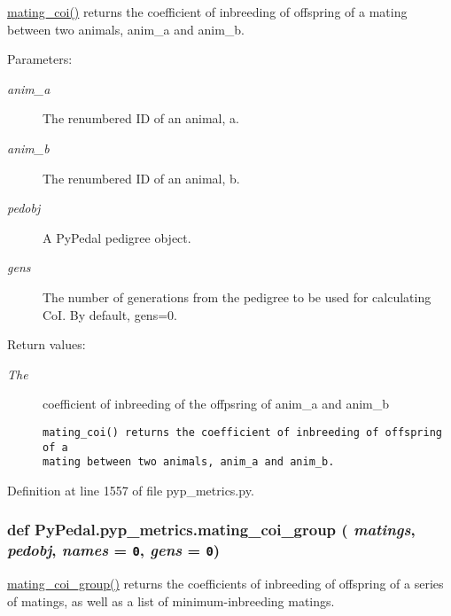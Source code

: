 \hyperlink{namespacePyPedal_1_1pyp__metrics_41c2baf2ca7fae116732adc32ff3a51b}{mating\_\-coi()} returns the coefficient of inbreeding of offspring of a mating between two animals, anim\_\-a and anim\_\-b. 

\begin{Desc}
\item[Parameters:]
\begin{description}
\item[{\em anim\_\-a}]The renumbered ID of an animal, a. \item[{\em anim\_\-b}]The renumbered ID of an animal, b. \item[{\em pedobj}]A Py\-Pedal pedigree object. \item[{\em gens}]The number of generations from the pedigree to be used for calculating Co\-I. By default, gens=0. \end{description}
\end{Desc}
\begin{Desc}
\item[Return values:]
\begin{description}
\item[{\em The}]coefficient of inbreeding of the offpsring of anim\_\-a and anim\_\-b

\footnotesize\begin{verbatim}mating_coi() returns the coefficient of inbreeding of offspring of a
mating between two animals, anim_a and anim_b.
\end{verbatim}
\normalsize
 \end{description}
\end{Desc}


Definition at line 1557 of file pyp\_\-metrics.py.\hypertarget{namespacePyPedal_1_1pyp__metrics_e051130e25232f609ede648a4dea9986}{
\subsubsection[mating\_\-coi\_\-group]{\setlength{\rightskip}{0pt plus 5cm}def Py\-Pedal.pyp\_\-metrics.mating\_\-coi\_\-group ( {\em matings},  {\em pedobj},  {\em names} = {\tt 0},  {\em gens} = {\tt 0})}}
\label{namespacePyPedal_1_1pyp__metrics_e051130e25232f609ede648a4dea9986}


\hyperlink{namespacePyPedal_1_1pyp__metrics_e051130e25232f609ede648a4dea9986}{mating\_\-coi\_\-group()} returns the coefficients of inbreeding of offspring of a series of matings, as well as a list of minimum-inbreeding matings. 

